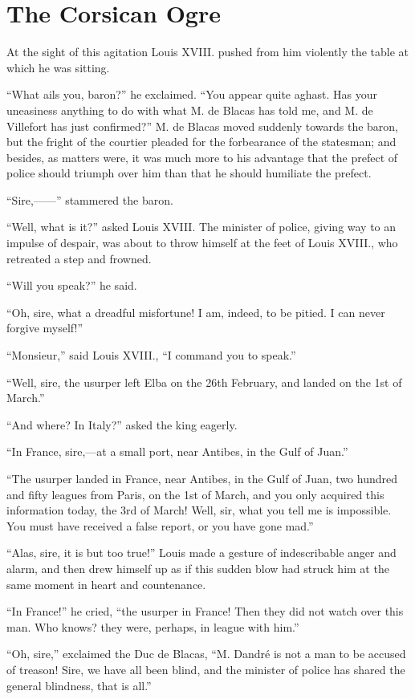 \chapter{The Corsican Ogre}

At the sight of this agitation Louis XVIII. pushed from him violently
the table at which he was sitting.

“What ails you, baron?” he exclaimed. “You appear quite aghast. Has
your uneasiness anything to do with what M. de Blacas has told me, and
M. de Villefort has just confirmed?” M. de Blacas moved suddenly
towards the baron, but the fright of the courtier pleaded for the
forbearance of the statesman; and besides, as matters were, it was much
more to his advantage that the prefect of police should triumph over
him than that he should humiliate the prefect.

“Sire,——” stammered the baron.

“Well, what is it?” asked Louis XVIII. The minister of police, giving
way to an impulse of despair, was about to throw himself at the feet of
Louis XVIII., who retreated a step and frowned.

“Will you speak?” he said.

“Oh, sire, what a dreadful misfortune! I am, indeed, to be pitied. I
can never forgive myself!”

“Monsieur,” said Louis XVIII., “I command you to speak.”

“Well, sire, the usurper left Elba on the 26th February, and landed on
the 1st of March.”

“And where? In Italy?” asked the king eagerly.

“In France, sire,—at a small port, near Antibes, in the Gulf of Juan.”

“The usurper landed in France, near Antibes, in the Gulf of Juan, two
hundred and fifty leagues from Paris, on the 1st of March, and you only
acquired this information today, the 3rd of March! Well, sir, what you
tell me is impossible. You must have received a false report, or you
have gone mad.”

“Alas, sire, it is but too true!” Louis made a gesture of indescribable
anger and alarm, and then drew himself up as if this sudden blow had
struck him at the same moment in heart and countenance.

“In France!” he cried, “the usurper in France! Then they did not watch
over this man. Who knows? they were, perhaps, in league with him.”

“Oh, sire,” exclaimed the Duc de Blacas, “M. Dandré is not a man to be
accused of treason! Sire, we have all been blind, and the minister of
police has shared the general blindness, that is all.”

